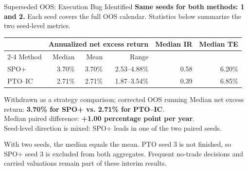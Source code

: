 \documentclass[aspectratio=169,xcolor=dvipsnames]{beamer}
\begin{document}
\begin{frame}{Superseded OOS: Execution Bug Identified}
    \small
    \textbf{Same seeds for both methods: 1 and 2.} Each seed covers the full OOS
    calendar. Statistics below summarize the two seed-level metrics.
    \vspace{2pt}
    \begin{table}
    \centering\small\setlength{\tabcolsep}{6pt}
    \begin{tabular}{l r r r r r}
    \toprule
    & \multicolumn{3}{c}{Annualized net excess return} & Median IR & Median TE \\
    \cmidrule(lr){2-4}
    Method & Median & Mean & Range & & \\
    \midrule
SPO+ & 3.70\% & 3.70\% & 2.53--4.88\% & 0.58 & 6.20\% \\
PTO--IC & 2.71\% & 2.71\% & 1.87--3.54\% & 0.39 & 6.85\% \\
    \bottomrule
    \end{tabular}
    \end{table}
    \vspace{2pt}
    \begin{block}{Withdrawn as a strategy comparison; corrected OOS running}
    Median net excess return: \textbf{3.70\% for SPO+ vs. 2.71\% for PTO--IC}.\\
    Median paired difference: \textbf{+1.00 percentage point per year}.\\
    Seed-level direction is mixed: SPO+ leads in one of the two paired seeds.
    \end{block}
    \vspace{4pt}
    \footnotesize With two seeds, the median equals the mean. PTO seed 3 is not
    finished, so SPO+ seed 3 is excluded from both aggregates. Frequent no-trade
    decisions and carried valuations remain part of these interim results.
\end{frame}
\end{document}
